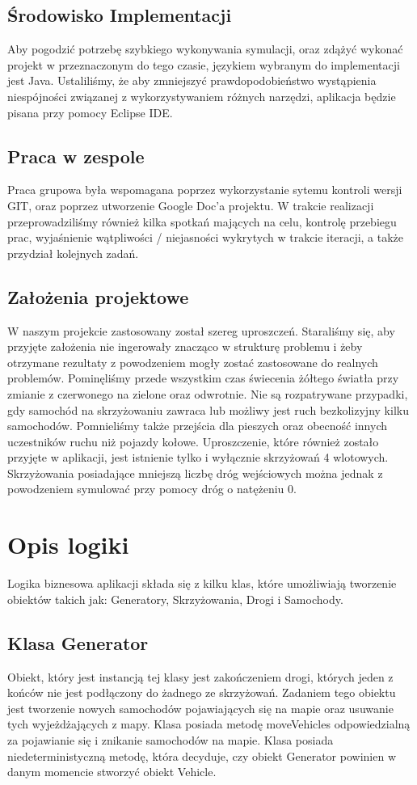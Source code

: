 \documentclass{article}
\begin{document}
\subsection{Środowisko Implementacji}
    Aby pogodzić potrzebę szybkiego wykonywania symulacji, oraz zdążyć wykonać projekt w przeznaczonym do tego czasie, językiem wybranym do implementacji jest Java. Ustaliliśmy, że aby zmniejszyć prawdopodobieństwo wystąpienia niespójności związanej z wykorzystywaniem różnych narzędzi, aplikacja będzie pisana przy pomocy Eclipse IDE. 

\subsection{Praca w zespole}
    Praca grupowa była wspomagana poprzez wykorzystanie sytemu kontroli wersji GIT, oraz poprzez utworzenie Google Doc'a projektu. W trakcie realizacji przeprowadziliśmy również kilka spotkań mających na celu, kontrolę przebiegu prac, wyjaśnienie wątpliwości / niejasności wykrytych w trakcie iteracji, a także przydział kolejnych zadań.

\subsection{Założenia projektowe}
    W naszym projekcie zastosowany został szereg uproszczeń. Staraliśmy się, aby przyjęte założenia nie ingerowały znacząco w strukturę problemu i żeby otrzymane rezultaty z powodzeniem mogły zostać zastosowane do realnych problemów. Pominęliśmy przede wszystkim czas świecenia żółtego światła przy zmianie z czerwonego na zielone oraz odwrotnie. Nie są rozpatrywane przypadki, gdy samochód na skrzyżowaniu zawraca lub możliwy jest ruch bezkolizyjny kilku samochodów. Pomnieliśmy także przejścia dla pieszych oraz obecność innych uczestników ruchu niż pojazdy kołowe. Uproszczenie, które również zostało przyjęte w aplikacji, jest istnienie tylko i wyłącznie skrzyżowań 4 wlotowych. Skrzyżowania posiadające mniejszą liczbę dróg wejściowych można jednak z powodzeniem symulować przy pomocy dróg o natężeniu 0.
\section{Opis logiki}
  Logika biznesowa aplikacji składa się z kilku klas, które umożliwiają tworzenie obiektów takich jak: Generatory, Skrzyżowania, Drogi i Samochody. 

\subsection{Klasa Generator}
    Obiekt, który jest instancją tej klasy jest zakończeniem drogi, których jeden z końców nie jest podłączony do żadnego ze skrzyżowań. Zadaniem tego obiektu jest tworzenie nowych samochodów pojawiających się na mapie oraz usuwanie tych wyjeżdżających z mapy. Klasa posiada metodę moveVehicles odpowiedzialną za pojawianie się i znikanie samochodów na mapie. Klasa posiada  niedeterministyczną metodę, która decyduje, czy obiekt Generator powinien w danym momencie stworzyć obiekt Vehicle.
\end{document}
